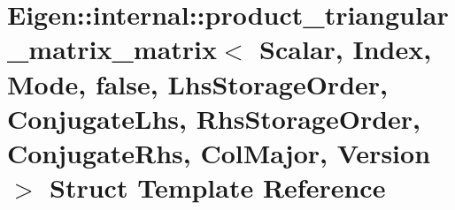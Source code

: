 \hypertarget{struct_eigen_1_1internal_1_1product__triangular__matrix__matrix_3_01_scalar_00_01_index_00_01_mo073ec17ef20b8a50e2a38e240dd8d795}{}\section{Eigen\+:\+:internal\+:\+:product\+\_\+triangular\+\_\+matrix\+\_\+matrix$<$ Scalar, Index, Mode, false, Lhs\+Storage\+Order, Conjugate\+Lhs, Rhs\+Storage\+Order, Conjugate\+Rhs, Col\+Major, Version $>$ Struct Template Reference}
\label{struct_eigen_1_1internal_1_1product__triangular__matrix__matrix_3_01_scalar_00_01_index_00_01_mo073ec17ef20b8a50e2a38e240dd8d795}
